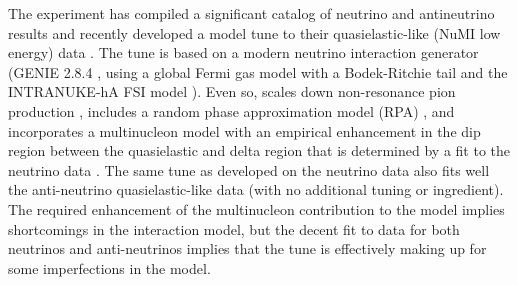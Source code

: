 The  experiment has compiled a significant catalog of neutrino and antineutrino results and recently developed a model tune to their quasielastic-like  (NuMI low energy) data \cite{Ruterbories:2018gub}.  The tune is based on a modern neutrino interaction generator (GENIE 2.8.4 \cite{Andreopoulos:2009rq}, using a global Fermi gas model \cite{Smith:1972xh}  with a Bodek-Ritchie tail \cite{Bodek:1981wr} and the INTRANUKE-hA FSI model \cite{Dytman:2007zz}).  Even so,  scales down non-resonance pion production \cite{Rodrigues:2016xjj}, includes a random phase approximation model (RPA) \cite{Nieves:2004wx,Gran:2017psn}, and incorporates a multinucleon model \cite{Nieves:2011pp, Gran:2013kda, Schwehr:2016pvn} with an empirical enhancement in the dip region between the quasielastic and delta region that is determined by a fit to the neutrino data \cite{Ruterbories:2018gub}.  The same tune as developed on the neutrino data also fits well the  anti-neutrino quasielastic-like data (with no additional tuning or ingredient).  The required enhancement of the multinucleon contribution to the model implies shortcomings in the interaction model, but the decent fit to data for both neutrinos and anti-neutrinos implies that the tune is effectively making up for some imperfections in the model. 

